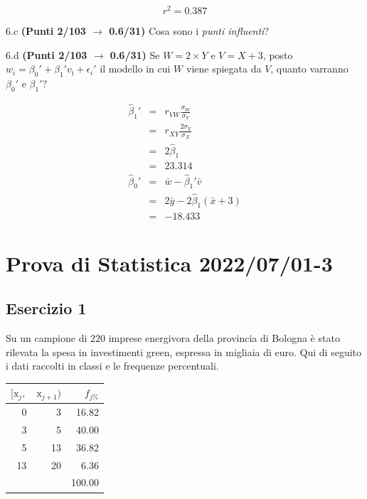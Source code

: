 \documentclass[
  11pt,
]{book}
\theoremstyle{mytheoremstyle}
\theoremstyle{mydefstyle}
\newenvironment{sol}
  {
  \begin{tcolorbox}[enhanced,breakable,arc=0.1mm,boxrule=1pt,colback=white,colframe=iblue,
  title=\bf \fontfamily{lmss}\selectfont \hspace{.5 cm} Soluzione,drop fuzzy shadow]

}{
\end{tcolorbox}
  }
\begin{document}
\[r^2=0.387\]

6.c \textbf{(Punti 2/103 \(\rightarrow\) 0.6/31)} Cosa sono i \emph{punti influenti}?

6.d \textbf{(Punti 2/103 \(\rightarrow\) 0.6/31)} Se \(W=2\times Y\) e \(V=X+3\), posto \(w_i=\beta_0'+\beta_1'v_ì +\epsilon_i'\)
il modello in cui \(W\) viene spiegata da \(V\), quanto varranno \(\beta_0'\) e \(\beta_1'\)?

\begin{sol}
\begin{eqnarray*}
   \hat\beta_1' &=&  r_{VW}\frac{\sigma_W}{\sigma_V} \\
            &=&  r_{XY}\frac{2\sigma_Y}{\sigma_X} \\
            &=& 2\hat\beta_1\\
            &=& 23.314\\
  \hat\beta_0' &=& \bar w - \hat\beta_1'\bar v\\
            &=& 2\bar y-2\hat\beta_1(\bar x + 3)\\
            &=& -18.433
\end{eqnarray*}

\end{sol}

\section{Prova di Statistica 2022/07/01-3}\label{prova-di-statistica-20220701-3}

\subsection{Esercizio 1}\label{esercizio-1-15}

Su un campione di \(220\) imprese energivora della provincia di Bologna è stato
rilevata la spesa in investimenti green, espressa in migliaia di euro. Qui di seguito i dati raccolti in classi
e le frequenze percentuali.

\begin{table}[H]
\centering
\begin{tabular}{rrr}
\toprule
$[\text{x}_j,$ & $\text{x}_{j+1})$ & $f_{j\%}$\\
\midrule
0 & 3 & 16.82\\
3 & 5 & 40.00\\
5 & 13 & 36.82\\
13 & 20 & 6.36\\
 &  & 100.00\\
\bottomrule
\end{tabular}
\end{table}
\end{document}
